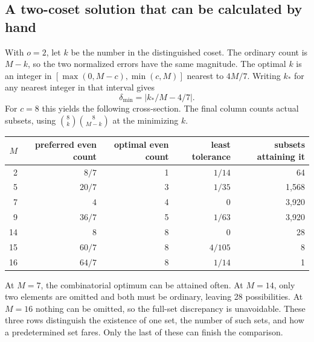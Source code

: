 \documentclass[12pt,letterpaper]{article}
\begin{document}
\subsection{A two-coset solution that can be calculated by hand}
With $o=2$, let $k$ be the number in the distinguished coset. The ordinary count is $M-k$, so the two normalized errors have the same magnitude. The optimal $k$ is an integer in $[\max(0,M-c),\min(c,M)]$ nearest to $4M/7$. Writing $k_*$ for any nearest integer in that interval gives
\[
              \delta_{\min}=\left|k_*/M-4/7\right|.
\]
For $c=8$ this yields the following cross-section. The final column counts actual subsets, using $\binom8k\binom8{M-k}$ at the minimizing $k$.
\begin{center}\small
\begin{tabular}{@{}rrrrr@{}}\toprule
$M$ & preferred even count & optimal even count & least tolerance & subsets attaining it\\\midrule
2 & $8/7$ & 1 & $1/14$ & 64\\
5 & $20/7$ & 3 & $1/35$ & 1,568\\
7 & $4$ & 4 & 0 & 3,920\\
9 & $36/7$ & 5 & $1/63$ & 3,920\\
14 & $8$ & 8 & 0 & 28\\
15 & $60/7$ & 8 & $4/105$ & 8\\
16 & $64/7$ & 8 & $1/14$ & 1\\\bottomrule
\end{tabular}\end{center}
At $M=7$, the combinatorial optimum can be attained often. At $M=14$, only two elements are omitted and both must be ordinary, leaving 28 possibilities. At $M=16$ nothing can be omitted, so the full-set discrepancy is unavoidable. These three rows distinguish the existence of one set, the number of such sets, and how a predetermined set fares. Only the last of these can finish the comparison.
\end{document}
